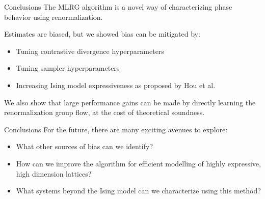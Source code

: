 \documentclass[aspectratio=169, 12pt]{beamer}
\begin{document}
\begin{frame}{Conclusions}
    The MLRG algorithm is a novel way of characterizing phase behavior using renormalization. 

    \vspace{1em}

    Estimates are biased, but we showed bias can be mitigated by:
    \begin{itemize}
        \item Tuning contrastive divergence hyperparameters
        \item Tuning sampler hyperparameters
        \item Increasing Ising model expressiveness as proposed by Hou et al. 
    \end{itemize}
    
    We also show that large performance gains can be made by directly learning the renormalization group flow, at the cost of theoretical soundness. 

\end{frame}

\begin{frame}{Conclusions}
    For the future, there are many exciting avenues to explore:
    \begin{itemize}
        \item What other sources of bias can we identify?
        \item How can we improve the algorithm for efficient modelling of highly expressive, high dimension lattices?
        \item What systems beyond the Ising model can we characterize using this method?
    \end{itemize}
\end{frame}
\end{document}
